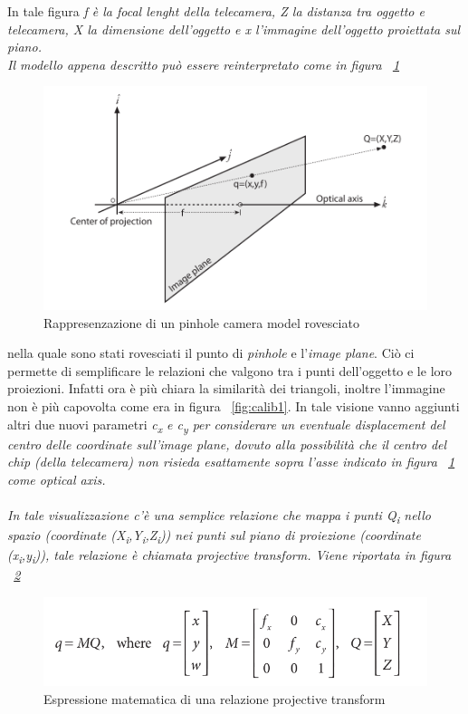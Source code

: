 In tale figura \em{f} è la \em{focal lenght} della telecamera, \textit{Z} la distanza tra oggetto e telecamera, \em{X} la dimensione dell'oggetto e \em{x} l'immagine dell'oggetto proiettata sul piano. \\ Il modello appena descritto può essere reinterpretato come in figura ~\ref{fig:calib2} 
\begin{figure}[htpb] 
\centering 
\includegraphics[scale=0.4]{./images/calib2.png} 
\caption{Rappresenzazione di un pinhole camera model rovesciato} 
\label{fig:calib2}
\end{figure} 

nella quale sono stati rovesciati il punto di \textit{pinhole} e l'\textit{image plane}. Ciò ci permette di semplificare le relazioni che valgono tra i punti dell'oggetto e le loro proiezioni. Infatti ora è più chiara la similarità dei triangoli, inoltre l'immagine non è più capovolta come era in figura ~\ref{fig:calib1}. In tale visione vanno aggiunti altri due nuovi parametri \em{c\textsubscript{x} }e \em{c\textsubscript{y}} per considerare un eventuale \textit{displacement} del centro delle coordinate sull'\textit{image plane}, dovuto alla possibilità che il centro del chip (della telecamera) non risieda esattamente sopra l'asse indicato in figura ~\ref{fig:calib2} come \textit{optical axis}. \\ \\
In tale visualizzazione c'è una semplice relazione che mappa i punti \em{Q\textsubscript{i}} nello spazio (coordinate (\em{X\textsubscript{i}},\em{Y\textsubscript{i}},\em{Z\textsubscript{i}})) nei punti sul piano di proiezione (coordinate (\em{x\textsubscript{i}},\em{y\textsubscript{i}})), tale relazione è chiamata \textit{projective transform}. Viene riportata in figura ~\ref{fig:calib3}
\begin{figure}[htpb] 
\centering 
\includegraphics[scale=0.4]{./images/calib3.png} 
\caption{Espressione matematica di una relazione projective transform} 
\label{fig:calib3}
\end{figure} 

